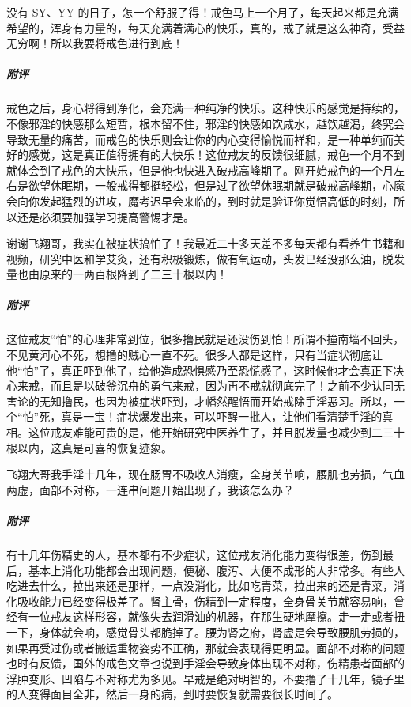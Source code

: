 \begin{case}
    没有 SY、YY 的日子，怎一个舒服了得！戒色马上一个月了，每天起来都是充满希望的，浑身有力量的，每天充满着满心的快乐，真的，戒了就是这么神奇，受益无穷啊！所以我要将戒色进行到底！
    \subparagraph{附评} 戒色之后，身心将得到净化，会充满一种纯净的快乐。这种快乐的感觉是持续的，不像邪淫的快感那么短暂，根本留不住，邪淫的快感如饮咸水，越饮越渴，终究会导致无量的痛苦，而戒色的快乐则会让你的内心变得愉悦而祥和，是一种单纯而美好的感觉，这是真正值得拥有的大快乐！这位戒友的反馈很细腻，戒色一个月不到就体会到了戒色的大快乐，但是他也快进入破戒高峰期了。刚开始戒色的一个月左右是欲望休眠期，一般戒得都挺轻松，但是过了欲望休眠期就是破戒高峰期，心魔会向你发起猛烈的进攻，魔考迟早会来临的，到时就是验证你觉悟高低的时刻，所以还是必须要加强学习提高警惕才是。
\end{case}

\begin{case}
    谢谢飞翔哥，我实在被症状搞怕了！我最近二十多天差不多每天都有看养生书籍和视频，研究中医和学艾灸，还有积极锻炼，做有氧运动，头发已经没那么油，脱发量也由原来的一两百根降到了二三十根以内！
    \subparagraph{附评} 这位戒友“怕”的心理非常到位，很多撸民就是还没伤到怕！所谓不撞南墙不回头，不见黄河心不死，想撸的贼心一直不死。很多人都是这样，只有当症状彻底让他“怕”了，真正吓到他了，给他造成恐惧感乃至恐慌感了，这时候他才会真正下决心来戒，而且是以破釜沉舟的勇气来戒，因为再不戒就彻底完了！之前不少认同无害论的无知撸民，也因为被症状吓到，才幡然醒悟而开始戒除手淫恶习。所以，一个“怕”死，真是一宝！症状爆发出来，可以吓醒一批人，让他们看清楚手淫的真相。这位戒友难能可贵的是，他开始研究中医养生了，并且脱发量也减少到二三十根以内，这真是可喜的恢复迹象。
\end{case}

\begin{case}
    飞翔大哥我手淫十几年，现在肠胃不吸收人消瘦，全身关节响，腰肌也劳损，气血两虚，面部不对称，一连串问题开始出现了，我该怎么办？
    \subparagraph{附评} 有十几年伤精史的人，基本都有不少症状，这位戒友消化能力变得很差，伤到最后，基本上消化功能都会出现问题，便秘、腹泻、大便不成形的人非常多。有些人吃进去什么，拉出来还是那样，一点没消化，比如吃青菜，拉出来的还是青菜，消化吸收能力已经变得极差了。肾主骨，伤精到一定程度，全身骨关节就容易响，曾经有一位戒友这样形容，就像失去润滑油的机器，在那生硬地摩擦。走一走或者扭一下，身体就会响，感觉骨头都脆掉了。腰为肾之府，肾虚是会导致腰肌劳损的，如果再受过伤或者搬运重物姿势不正确，那就会表现得更明显。面部不对称的问题也时有反馈，国外的戒色文章也说到手淫会导致身体出现不对称，伤精患者面部的浮肿变形、凹陷与不对称尤为多见。早戒是绝对明智的，不要撸了十几年，镜子里的人变得面目全非，然后一身的病，到时要恢复就需要很长时间了。
\end{case}

